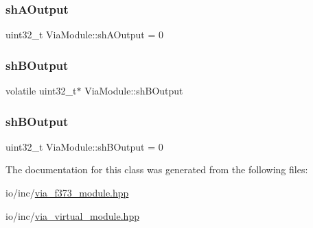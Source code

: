 \subsubsection{\texorpdfstring{sh\+A\+Output}{shAOutput}\hspace{0.1cm}{\footnotesize\ttfamily [2/2]}}
{\footnotesize\ttfamily uint32\+\_\+t Via\+Module\+::sh\+A\+Output = 0}

\mbox{\label{class_via_module_a9d6d3dd39cf5560aaf2b14a6d7c4a46b}} 
\subsubsection{\texorpdfstring{sh\+B\+Output}{shBOutput}\hspace{0.1cm}{\footnotesize\ttfamily [1/2]}}
{\footnotesize\ttfamily volatile uint32\+\_\+t$\ast$ Via\+Module\+::sh\+B\+Output}

\mbox{\label{class_via_module_a7cfbe5fe6b6afb143cb55ff53cdcc90e}} 
\subsubsection{\texorpdfstring{sh\+B\+Output}{shBOutput}\hspace{0.1cm}{\footnotesize\ttfamily [2/2]}}
{\footnotesize\ttfamily uint32\+\_\+t Via\+Module\+::sh\+B\+Output = 0}



The documentation for this class was generated from the following files\+:\begin{DoxyCompactItemize}
\item 
io/inc/\mbox{\hyperlink{via__f373__module_8hpp}{via\+\_\+f373\+\_\+module.\+hpp}}\item 
io/inc/\mbox{\hyperlink{via__virtual__module_8hpp}{via\+\_\+virtual\+\_\+module.\+hpp}}\end{DoxyCompactItemize}
